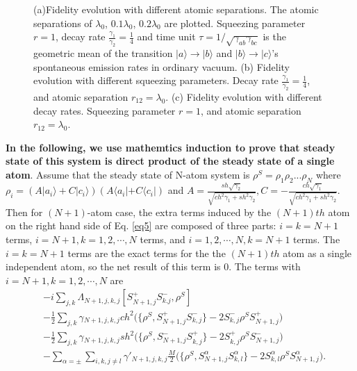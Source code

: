 \documentclass[aps,showpacs,twocolumn,twoside,groupedaddress]{revtex4}
\begin{document}
\begin{figure}
	\caption{(a)Fidelity evolution with different atomic separations. The atomic separations of $\lambda_0$, $0.1\lambda_0$, $0.2\lambda_0$ are plotted. Squeezing parameter $r=1$, decay rate $\frac{\gamma_1}{\gamma_2}=\frac{1}{4}$ and time unit $\tau=1/\sqrt{\gamma_{ab}\gamma_{bc}}$ is the geometric mean of the transition $|a\rangle\rightarrow|b\rangle$ and $|b\rangle\rightarrow|c\rangle$'s spontaneous emission rates in ordinary vacuum. (b) Fidelity evolution with different squeezing parameters. Decay rate $\frac{\gamma_1}{\gamma_2}=\frac{1}{4}$, and atomic separation $r_{12}=\lambda_0$. (c) Fidelity evolution with different decay rates. Squeezing parameter $r=1$, and atomic separation $r_{12}=\lambda_0$. }
	\label{3}
\end{figure}

\textbf{In the following, we use mathemtics induction to prove that steady state of this system is direct product of the steady state of a single atom}. Assume that the steady state of N-atom system is $\rho^{S}=\rho_{1}\rho_{2}...\rho_{N}$ where $\rho_{i}=(A|a_{i}\rangle+C|c_{i}\rangle)(A\langle a_{i}|+C\langle c_{i}|)$ and $A=\frac{sh\sqrt{\gamma_{2}}}{\sqrt{ch^{2}\gamma_{1}+sh^{2}\gamma_{2}}}, C=-\frac{ch\sqrt{\gamma_{1}}}{\sqrt{ch^{2}\gamma_{1}+sh^{2}\gamma_{2}}}$. Then for $(N+1)$-atom case, the extra terms induced by the $(N+1)th$ atom on the right hand side of Eq. \eqref{eq5} are composed of three parts: $i=k=N+1$ terms, $i=N+1, k=1,2,\cdots,N$ terms, and $i=1,2,\cdots,N, k=N+1$ terms. The $i=k=N+1$ terms are the exact terms for the the $(N+1)th$ atom as a single independent atom, so the net result of this term is 0. The terms with $i=N+1, k=1,2,\cdots, N$ are 
\begin{equation}
\label{eq6}
\begin{split}
&-i\underset{j,k}{\sum}\Lambda_{N+1,j,k,j}[S_{N+1,j}^{+}S_{k.j}^{-},\rho^{S}] \\
&-\frac{1}{2}\underset{j,k}{\sum}\gamma{}_{N+1,j,k,j}ch^{2}\Big(\{\rho^{S},S_{N+1,j}^{+}S_{k,j}^{-}\}-2S_{k,j}^{-}\rho^{S}S_{N+1,j}^{+}\Big)\\
&-\frac{1}{2}\underset{j,k}{\sum}\gamma{}_{N+1,j,k,j}sh^{2}\Big(\{\rho^{S},S_{N+1,j}^{-}S_{k,j}^{+}\}-2S_{k,j}^{+}\rho^{S}S_{N+1,j}^{-}\Big) \\
&-\sum_{\alpha=\pm}\underset{i,k,j\ne l}{\sum}\gamma'_{N+1,j,k,j}\frac{M}{2}\Big(\{\rho^{S},S_{N+1,j}^{\alpha}S_{k,l}^{\alpha}\} -2S_{k,l}^{\alpha}\rho^{S}S_{N+1,j}^{\alpha}\Big).
\end{split}
\end{equation}
\end{document}
